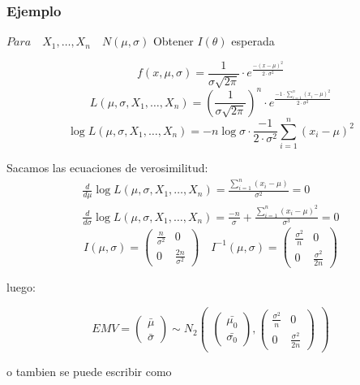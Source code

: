 \subsubsection*{Ejemplo}
\(
Para \quad X_1,\dots,X_n \quad N(\mu,\sigma) 
\)
Obtener $I(\theta)$ esperada

\[
f(x,\mu,\sigma)=\frac{1}{\sigma \sqrt{2 \pi}} \cdot e^{\frac{-(x-\mu)^2}{2 \cdot \sigma^2}}
\]\[ L(\mu,\sigma,X_1,\dots,X_n)= \left(\frac{1}{\sigma \sqrt{2 \pi}}\right)^n \cdot e^{\frac{-1 \cdot \sum_{i=1}^{n}(x_i-\mu)^2}{2 \cdot \sigma^2}}
\]\[ \log L(\mu,\sigma,X_1,\dots,X_n)= -n \log \sigma \cdot \frac{-1}{2 \cdot \sigma^2} \sum_{i=1}^{n}(x_i-\mu)^2
\]

Sacamos las ecuaciones de verosimilitud:
\[
\begin{matrix}
    \frac{d}{d \mu} \log L(\mu,\sigma,X_1,\dots,X_n)=\frac{\sum_{i=1}^{n} (x_i-\mu)}{\sigma^2}=0 \\
    \frac{d}{d \sigma} \log L(\mu,\sigma,X_1,\dots,X_n)=\frac{-n}{\sigma}+ \frac{\sum_{i=1}^{n}(x_i-\mu)^2}{\sigma^3}=0
\end{matrix}
\]
\[
I(\mu,\sigma)=
\begin{pmatrix}
    \frac{n}{\sigma^2} & 0\\
    0 & \frac{2n}{\sigma^2}
\end{pmatrix}
\quad I^{-1}(\mu,\sigma)=
\begin{pmatrix}
    \frac{\sigma^2}{n} & 0\\
    0 & \frac{\sigma^2}{2n}
\end{pmatrix}
\]

luego:

\[
EMV=
\begin{pmatrix}
    \bar{\mu}\\
    \bar{\sigma}
\end{pmatrix}
\sim N_2
\begin{pmatrix}

\begin{pmatrix}
    \bar{\mu_0}\\
    \bar{\sigma_0}
\end{pmatrix}
,
\begin{pmatrix}
    \frac{\sigma^2}{n} & 0\\
    0 & \frac{\sigma^2}{2n}
\end{pmatrix}
    
\end{pmatrix}
\]

o tambien se puede escribir como


